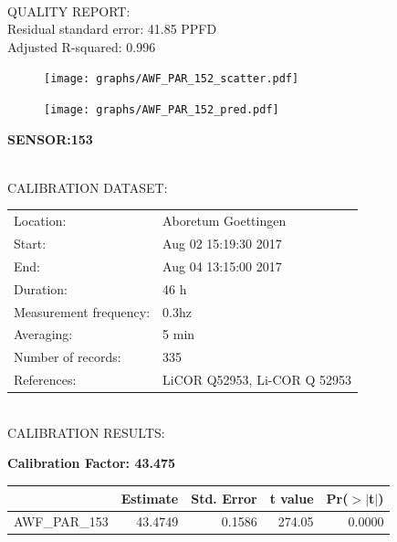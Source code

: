 \documentclass[oneside]{report}
\begin{document}
\hrulefill\\
QUALITY REPORT:\\
Residual standard error: 41.85 PPFD\\
Adjusted R-squared: 0.996



\begin{figure}[H]
  \centering
  \texttt{[image: graphs/AWF\_PAR\_152\_scatter.pdf]}
\end{figure}




\begin{figure}[H]
  \centering
  \texttt{[image: graphs/AWF\_PAR\_152\_pred.pdf]}
\end{figure}

\pagebreak


\begin{center}
\large{\textbf{SENSOR:153}}\\
\end{center}

\hrulefill\\
CALIBRATION DATASET:\\
\begin{table}[h!]
  \centering
  \label{tab:table1}
  \begin{tabular}{ll}
    Location: & Aboretum Goettingen\\ 
    
    
    Start:  & Aug 02 15:19:30 2017 \\
    End:   & Aug 04 13:15:00 2017\\ 
    Duration: & 46 h\\
    Measurement frequency: & 0.3hz\\
    Averaging:  &5 min\\
    Number of records: & 335 \\
    References: & LiCOR Q52953, Li-COR Q 52953 \\
  \end{tabular}
\end{table}

\hrulefill\\
CALIBRATION RESULTS:\\


\begin{center}
\textbf{\large{Calibration Factor: 43.475}}\\
\end{center}
\begin{table}[ht]
\centering
\begin{tabular}{rrrrr}
  \hline
 & Estimate & Std. Error & t value & Pr($>$$|$t$|$) \\ 
  \hline
AWF\_PAR\_153 & 43.4749 & 0.1586 & 274.05 & 0.0000 \\ 
   \hline
\end{tabular}
\end{table}
\end{document}
